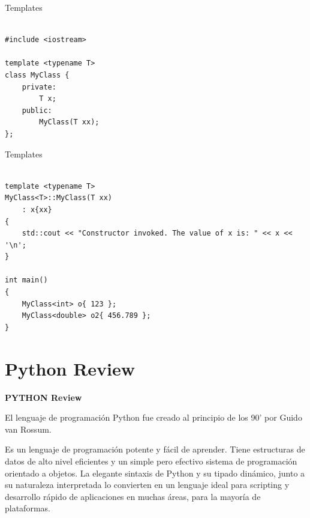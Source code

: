 \documentclass[11pt]{beamer}
\begin{document}
\begin{frame}[fragile]{Templates}
	\scriptsize
\begin{lstlisting}
	
#include <iostream>

template <typename T>
class MyClass {
	private:
		T x;
	public:
		MyClass(T xx);
};
\end{lstlisting}
\end{frame}

\begin{frame}[fragile]{Templates}
	\begin{lstlisting}
		
template <typename T>
MyClass<T>::MyClass(T xx)
	: x{xx}
{
	std::cout << "Constructor invoked. The value of x is: " << x << '\n';
}

int main()
{
	MyClass<int> o{ 123 };
	MyClass<double> o2{ 456.789 };
}

\end{lstlisting}

\end{frame}



\section{Python Review}

\begin{frame}
\centering	
\Huge{\textbf{PYTHON Review}}
\end{frame}	

\begin{frame}
	\small
El lenguaje de programación Python fue creado al principio de los 90’ por Guido van Rossum.\newline

Es un lenguaje de programación potente y fácil de aprender. Tiene estructuras de datos de alto nivel eficientes y un simple pero efectivo sistema de programación orientado a objetos. La elegante sintaxis de Python y su tipado dinámico, junto a su naturaleza interpretada lo convierten en un lenguaje ideal para scripting y desarrollo rápido de aplicaciones en muchas áreas, para la mayoría de plataformas.
\end{frame}	
\end{document}

